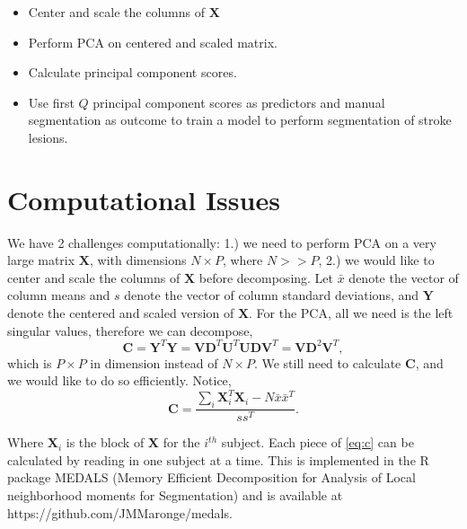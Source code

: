 \documentclass[a0,landscape]{a0poster}
\begin{document}
\begin{multicols}{3}
\begin{itemize}
\item  Center and scale the columns of $\mathbf{X}$
\item Perform PCA on centered and scaled matrix.
\item Calculate principal component scores. 
\item Use first $Q$ principal component scores as predictors and manual segmentation as outcome to train a model to perform segmentation of stroke lesions.
\end{itemize}
\large{\section*{\color{uwred}Computational Issues}}
\noindent We have 2 challenges computationally: 1.) we need to perform PCA on a very large matrix $\mathbf{X}$, with dimensions $N \times P$, where $N>>P$, 2.) we would like to center and scale the columns of $\mathbf{X}$ before decomposing. Let $\bar{x}$ denote the vector of column means and $s$ denote the vector of column standard deviations, and $\mathbf{Y}$ denote the centered and scaled version of $\mathbf{X}$. For the PCA, all we need is the left singular values, therefore we can decompose,
\begin{equation*}
\mathbf{C} = \mathbf{Y}^T\mathbf{Y} = \mathbf{V}\mathbf{D}^T\mathbf{U}^T\mathbf{U}\mathbf{D}\mathbf{V}^T = \mathbf{V}\mathbf{D}^2\mathbf{V}^T,
\end{equation*}
which is $P \times P$ in dimension instead of $N \times P$. We still need to calculate $\mathbf{C}$, and we would like to do so efficiently. Notice,
\begin{equation} \label{eq:c}
\mathbf{C} = \frac{\sum_i\mathbf{X}_i^T\mathbf{X}_i-N\bar{x}\bar{x}^T}{ss^T}.
\end{equation}

\noindent Where $\mathbf{X}_i$ is the block of $\mathbf{X}$ for the $i^{th}$ subject. Each piece of \ref{eq:c} can be calculated by reading in one subject at a time. This is implemented in the R package MEDALS (Memory Efficient Decomposition for Analysis of Local neighborhood moments for Segmentation) and is available at https://github.com/JMMaronge/medals.
\vspace{.5cm}




\end{multicols}
\end{document}
